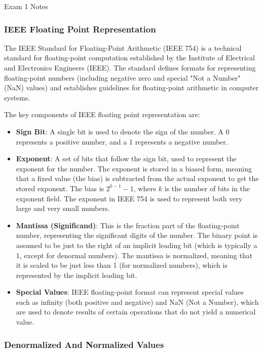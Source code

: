 \begin{examnotes}{Exam 1 Notes}
    \subsubsection*{IEEE Floating Point Representation}

    The IEEE Standard for Floating-Point Arithmetic (IEEE 754) is a technical standard for floating-point computation established by the Institute of Electrical and Electronics Engineers (IEEE). The 
    standard defines formats for representing floating-point numbers (including negative zero and special "Not a Number" (NaN) values) and establishes guidelines for floating-point arithmetic in 
    computer systems.

    The key components of IEEE floating point representation are:

    \begin{itemize}
        \item \textbf{Sign Bit}: A single bit is used to denote the sign of the number. A 0 represents a positive number, and a 1 represents a negative number.
        \item \textbf{Exponent}: A set of bits that follow the sign bit, used to represent the exponent for the number. The exponent is stored in a biased form, meaning that a fixed value (the bias) 
        is subtracted from the actual exponent to get the stored exponent. The bias is $2^{k - 1} - 1$, where $k$ is the number of bits in the exponent field. The exponent in IEEE 754 is used to 
        represent both very large and very small numbers.
        \item \textbf{Mantissa (Significand)}: This is the fraction part of the floating-point number, representing the significant digits of the number. The binary point is assumed to be just to the 
        right of an implicit leading bit (which is typically a 1, except for denormal numbers). The mantissa is normalized, meaning that it is scaled to be just less than 1 (for normalized numbers), 
        which is represented by the implicit leading bit.
        \item \textbf{Special Values}: IEEE floating-point format can represent special values such as infinity (both positive and negative) and NaN (Not a Number), which are used to denote results 
        of certain operations that do not yield a numerical value.
    \end{itemize}

    \subsubsection*{Denormalized And Normalized Values}


\end{examnotes}
